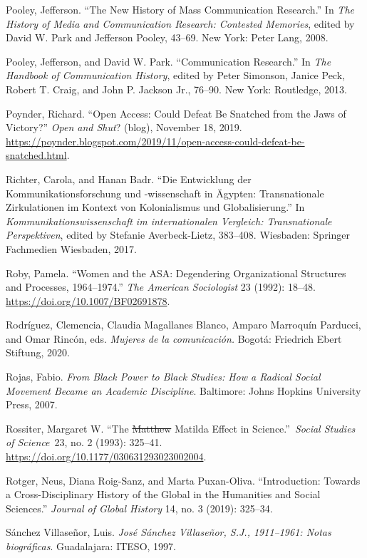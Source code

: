 \documentclass{tufte-handout}
\begin{document}
\begin{hangparas}{.25in}{1}
Pooley, Jefferson. ``The New History of Mass Communication Research.''
In \emph{The History of Media and Communication Research: Contested
Memories}, edited by David W. Park and Jefferson Pooley, 43--69. New
York: Peter Lang, 2008.

Pooley, Jefferson, and David W. Park. ``Communication Research.'' In
\emph{The Handbook of Communication History}, edited by Peter Simonson,
Janice Peck, Robert T. Craig, and John P. Jackson Jr., 76--90. New York:
Routledge, 2013.

Poynder, Richard. ``Open Access: Could Defeat Be Snatched from the Jaws
of Victory?'' \emph{Open and Shut}? (blog), November 18, 2019.
\href{https://poynder.blogspot.com/2019/11/open-access-could-defeat-be-snatched.html}{https://poynder.blogspot.com/2019/11/open-access-could-defeat-be-snatched.html}.

Richter, Carola, and Hanan Badr. ``Die Entwicklung der
Kommunikationsforschung und -wissenschaft in Ägypten: Transnationale
Zirkulationen im Kontext von Kolonialismus und Globalisierung.'' In
\emph{Kommunikationswissenschaft im internationalen Vergleich:
Transnationale Perspektiven}, edited by Stefanie Averbeck-Lietz,
383--408. Wiesbaden: Springer Fachmedien Wiesbaden, 2017.

Roby, Pamela. ``Women and the ASA: Degendering Organizational Structures
and Processes, 1964--1974.'' \emph{The American Sociologist} 23 (1992):
18--48. \url{https://doi.org/10.1007/BF02691878}.

Rodríguez, Clemencia, Claudia Magallanes Blanco, Amparo Marroquín
Parducci, and Omar Rincón, eds. \emph{Mujeres de la comunicación.}
Bogotá: Friedrich Ebert Stiftung, 2020.

Rojas, Fabio. \emph{From Black Power to Black Studies: How a Radical
Social Movement Became an Academic Discipline}. Baltimore: Johns Hopkins
University Press, 2007.

Rossiter, Margaret W. ``The \sout{Matthew} Matilda Effect in
Science.''~\emph{Social Studies of Science}~23, no. 2 (1993): 325--41.
\url{https://doi.org/10.1177/030631293023002004}.

Rotger, Neus, Diana Roig-Sanz, and Marta Puxan-Oliva. ``Introduction:
Towards a Cross-Disciplinary History of the Global in the Humanities and
Social Sciences.'' \emph{Journal of Global History} 14, no. 3 (2019):
325­--34.

Sánchez Villaseñor, Luis. \emph{José Sánchez Villaseñor, S.J.,
1911--1961: Notas biográficas}. Guadalajara: ITESO, 1997.


\end{hangparas}
\end{document}
